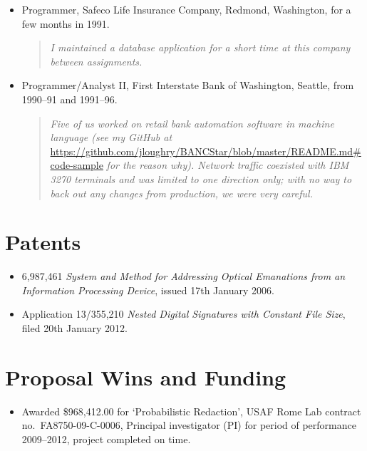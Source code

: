 \documentclass[letterpaper]{article}
\begin{document}
\begin{itemize}
	\item Programmer, Safeco Life Insurance Company, Redmond, Washington, for a few months
		in 1991.
		\begin{quote}\vspace{-2mm}
			\emph{I maintained a database application for a short time at this company
				between assignments.}
		\end{quote}

	\item Programmer/Analyst II, First Interstate Bank of Washington, Seattle,
		from 1990--91 and 1991--96.
		\begin{quote}\vspace{-2mm}
			\emph{Five of us worked on retail bank automation software in machine language
			(see my GitHub at}
			\url{https://github.com/jloughry/BANCStar/blob/master/README.md#code-sample}
			\emph{for the reason why).  Network traffic coexisted with IBM 3270 terminals
			and was limited to one direction only; with no way to back out any changes from
			production, we were very careful.}
		\end{quote}
\end{itemize}

\vspace{-5mm}
\section*{Patents}

\begin{itemize}
    \item 6,987,461 \emph{System and Method for Addressing Optical Emanations
		from an Information Processing Device}, issued 17th January 2006.

	\item Application 13/355,210 \emph{Nested Digital Signatures with Constant File Size},
		filed 20th January 2012.
\end{itemize}

\section*{Proposal Wins and Funding}

\begin{itemize}
	\item Awarded \$968,412.00 for `Probabilistic Redaction', USAF Rome Lab contract
	no.\ FA8750-09-C-0006, Principal investigator (PI) for period of performance
	2009--2012, project completed on time.
\end{itemize}
\end{document}

